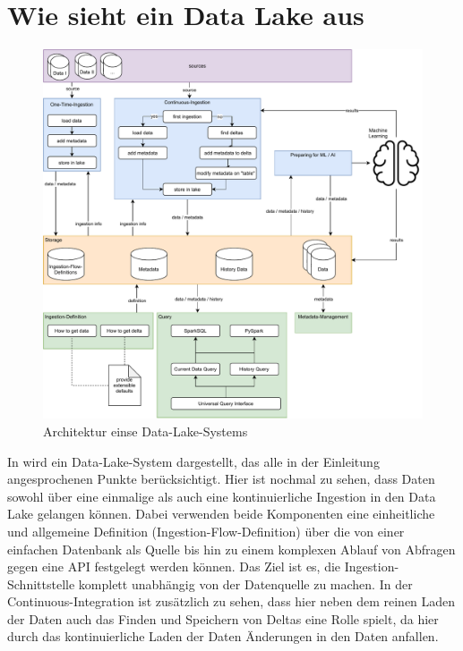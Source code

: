 \section{Wie sieht ein Data Lake aus}

\begin{figure}
  \begin{center}
    \includegraphics[width=\textwidth]{Grafiken/arch.pdf}
    \caption{Architektur einse Data-Lake-Systems}
    \label{fig:dl-arch}
  \end{center}
\end{figure}
In  wird ein Data-Lake-System dargestellt, das alle in der Einleitung angesprochenen Punkte berücksichtigt.
Hier ist nochmal zu sehen, dass Daten sowohl über eine einmalige als auch eine kontinuierliche Ingestion in den Data Lake gelangen können.
Dabei verwenden beide Komponenten eine einheitliche und allgemeine Definition (Ingestion-Flow-Definition) über die von einer einfachen Datenbank als Quelle bis hin zu einem komplexen Ablauf von Abfragen gegen eine API festgelegt werden können.
Das Ziel ist es, die Ingestion-Schnittstelle komplett unabhängig von der Datenquelle zu machen.
In der Continuous-Integration ist zusätzlich zu sehen, dass hier neben dem reinen Laden der Daten auch das Finden und Speichern von Deltas eine Rolle spielt, da hier durch das kontinuierliche Laden der Daten Änderungen in den Daten anfallen.

